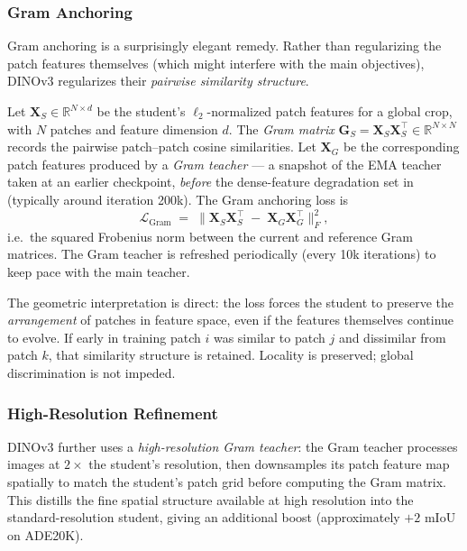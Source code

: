 \documentclass[11pt,a4paper]{article}
\newcommand{\R}{\mathbb{R}}
\newcommand{\vect}[1]{\mathbf{#1}}
\newcommand{\trans}{^{\top}}
\newcommand{\loss}{\mathcal{L}}
\begin{document}
\subsubsection{Gram Anchoring}

Gram anchoring is a surprisingly elegant remedy. Rather than regularizing
the patch features themselves (which might interfere with the main
objectives), DINOv3 regularizes their \emph{pairwise similarity structure}.

Let $\vect{X}_{S} \in \R^{N \times d}$ be the student's $\ell_{2}$-normalized
patch features for a global crop, with $N$ patches and feature dimension
$d$. The \emph{Gram matrix}
$\vect{G}_{S} = \vect{X}_{S}\vect{X}_{S}\trans \in \R^{N \times N}$
records the pairwise patch--patch cosine similarities. Let $\vect{X}_{G}$
be the corresponding patch features produced by a \emph{Gram teacher} ---
a snapshot of the EMA teacher taken at an earlier checkpoint, \emph{before}
the dense-feature degradation set in (typically around iteration 200k).
The Gram anchoring loss is
\begin{equation}
\loss_{\text{Gram}} \;=\; \bigl\| \vect{X}_{S}\vect{X}_{S}\trans \;-\; \vect{X}_{G}\vect{X}_{G}\trans \bigr\|_{F}^{2},
\label{eq:gram}
\end{equation}
i.e.\ the squared Frobenius norm between the current and reference Gram
matrices. The Gram teacher is refreshed periodically (every 10k iterations)
to keep pace with the main teacher.

The geometric interpretation is direct: the loss forces the student to
preserve the \emph{arrangement} of patches in feature space, even if the
features themselves continue to evolve. If early in training patch
$i$ was similar to patch $j$ and dissimilar from patch $k$, that
similarity structure is retained. Locality is preserved; global
discrimination is not impeded.

\subsubsection{High-Resolution Refinement}

DINOv3 further uses a \emph{high-resolution Gram teacher}: the Gram teacher
processes images at $2\times$ the student's resolution, then downsamples
its patch feature map spatially to match the student's patch grid
before computing the Gram matrix. This distills the fine spatial structure
available at high resolution into the standard-resolution student, giving
an additional boost (approximately $+2$ mIoU on ADE20K).
\end{document}
